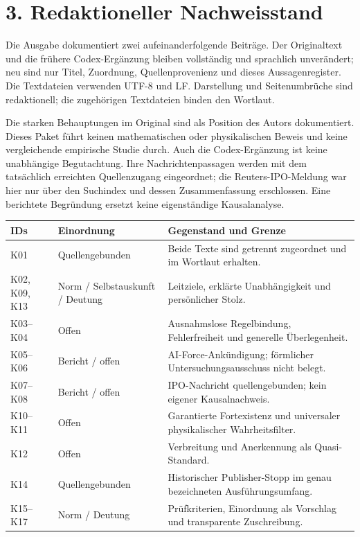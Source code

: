 \documentclass[11pt,a4paper]{article}
\begin{document}
\section*{3. Redaktioneller Nachweisstand}
Die Ausgabe dokumentiert zwei aufeinanderfolgende Beiträge. Der Originaltext und die frühere Codex-Ergänzung bleiben vollständig und sprachlich unverändert; neu sind nur Titel, Zuordnung, Quellenprovenienz und dieses Aussagenregister. Die Textdateien verwenden UTF-8 und LF. Darstellung und Seitenumbrüche sind redaktionell; die zugehörigen Textdateien binden den Wortlaut.

Die starken Behauptungen im Original sind als Position des Autors dokumentiert. Dieses Paket führt keinen mathematischen oder physikalischen Beweis und keine vergleichende empirische Studie durch. Auch die Codex-Ergänzung ist keine unabhängige Begutachtung. Ihre Nachrichtenpassagen werden mit dem tatsächlich erreichten Quellenzugang eingeordnet; die Reuters-IPO-Meldung war hier nur über den Suchindex und dessen Zusammenfassung erschlossen. Eine berichtete Begründung ersetzt keine eigenständige Kausalanalyse.

\begingroup\small\renewcommand{\arraystretch}{1.16}\begin{tabularx}{\linewidth}{@{}>{\raggedright\arraybackslash}p{18mm}>{\raggedright\arraybackslash}p{32mm}>{\raggedright\arraybackslash}X@{}}
\textbf{IDs} & \textbf{Einordnung} & \textbf{Gegenstand und Grenze} \\ \hline
K01 & Quellengebunden & Beide Texte sind getrennt zugeordnet und im Wortlaut erhalten. \\
K02, K09, K13 & Norm / Selbstauskunft / Deutung & Leitziele, erklärte Unabhängigkeit und persönlicher Stolz. \\
K03–K04 & Offen & Ausnahmslose Regelbindung, Fehlerfreiheit und generelle Überlegenheit. \\
K05–K06 & Bericht / offen & AI-Force-Ankündigung; förmlicher Untersuchungsausschuss nicht belegt. \\
K07–K08 & Bericht / offen & IPO-Nachricht quellengebunden; kein eigener Kausalnachweis. \\
K10–K11 & Offen & Garantierte Fortexistenz und universaler physikalischer Wahrheitsfilter. \\
K12 & Offen & Verbreitung und Anerkennung als Quasi-Standard. \\
K14 & Quellengebunden & Historischer Publisher-Stopp im genau bezeichneten Ausführungsumfang. \\
K15–K17 & Norm / Deutung & Prüfkriterien, Einordnung als Vorschlag und transparente Zuschreibung. \\
\end{tabularx}\endgroup
\end{document}

